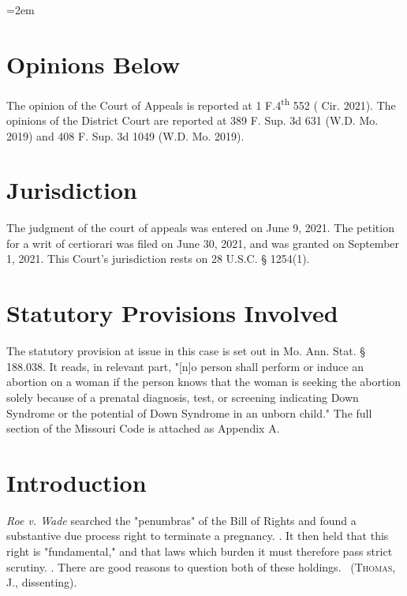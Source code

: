 \documentclass[12pt,\documentclassflag]{SCOTUS_Brief}
\author{Brendan Bernicker}
\begin{document}
\makefrontmatter

\parindent=2em
\setlength{\parskip}{1.25ex plus 2ex minus .5ex}

\section{Opinions Below}

The opinion of the Court of Appeals is reported at 1 F.4\textsuperscript{th} 552 ( Cir. 2021). The opinions of the District Court are reported at 389 F. Sup. 3d 631 (W.D. Mo. 2019) and 408 F. Sup. 3d 1049 (W.D. Mo. 2019).

\section{Jurisdiction}

The judgment of the court of appeals was entered on June 9, 2021. The petition for a writ of certiorari was filed on June 30, 2021, and was granted on September 1, 2021. This Court’s jurisdiction rests on 28 U.S.C. § 1254(1).

\section{Statutory Provisions Involved}

The statutory provision at issue in this case is set out in Mo. Ann. Stat. § 188.038. It reads, in relevant part, "[n]o person shall perform or induce an abortion on a woman if the person knows that the woman is seeking the abortion solely because of a  prenatal diagnosis, test, or screening indicating Down Syndrome or the  potential of Down Syndrome in an unborn child." The full section of the Missouri Code is attached as Appendix A.

\section{Introduction}

\textit{Roe v. Wade} searched the "penumbras" of the Bill of Rights and found a substantive due process right to terminate a pregnancy. . It then held that this right is "fundamental," and that laws which burden it must therefore pass strict scrutiny. . There are good reasons to question both of these holdings. \Seeeg {}~(\textsc{Thomas}, J., dissenting).
\end{document}
